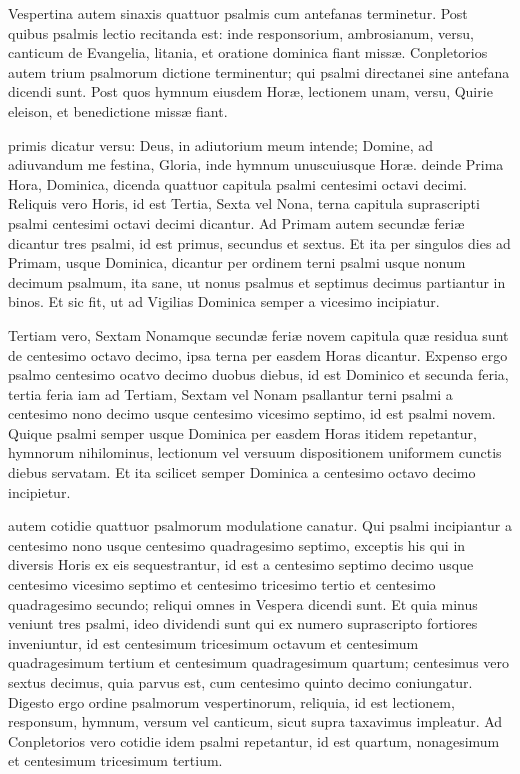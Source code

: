 \documentclass[fontsize=9pt,paper=A6,twoside,BCOR=1mm,DIV=22,headinclude]{scrarticle}
\begin{document}
\begin{multicols}{2}
{Vespertina autem sinaxis quattuor psalmis cum antefanas terminetur. Post quibus psalmis lectio recitanda est: inde responsorium, ambrosianum, versu, canticum de Evangelia, litania, et oratione dominica fiant missæ. Conpletorios autem trium psalmorum dictione terminentur; qui psalmi directanei sine antefana dicendi sunt. Post quos hymnum eiusdem Horæ, lectionem unam, versu, Quirie eleison, et benedictione missæ fiant. 

}

 primis dicatur versu: Deus, in adiutorium meum intende; Domine, ad adiuvandum me festina, Gloria, inde hymnum unuscuiusque Horæ. deinde Prima Hora, Dominica, dicenda quattuor capitula psalmi centesimi octavi decimi. Reliquis vero Horis, id est Tertia, Sexta vel Nona, terna capitula suprascripti psalmi centesimi octavi decimi dicantur. Ad Primam autem secundæ feriæ dicantur tres psalmi, id est primus, secundus et sextus. Et ita per singulos dies ad Primam, usque Dominica, dicantur per ordinem terni psalmi usque nonum decimum psalmum, ita sane, ut nonus psalmus et septimus decimus partiantur in binos. Et sic fit, ut ad Vigilias Dominica semper a vicesimo incipiatur.

 Tertiam vero, Sextam Nonamque secundæ feriæ novem capitula quæ residua sunt de centesimo octavo decimo, ipsa terna per easdem Horas dicantur. Expenso ergo psalmo centesimo ocatvo decimo duobus diebus, id est Dominico et secunda feria, tertia feria iam ad Tertiam, Sextam vel Nonam psallantur terni psalmi a centesimo nono decimo usque centesimo vicesimo septimo, id est psalmi novem. Quique psalmi semper usque Dominica per easdem Horas itidem repetantur, hymnorum nihilominus, lectionum vel versuum dispositionem uniformem cunctis diebus servatam. Et ita scilicet semper Dominica a centesimo octavo decimo incipietur.

 autem cotidie quattuor psalmorum modulatione canatur. Qui psalmi incipiantur a centesimo nono usque centesimo quadragesimo septimo, exceptis his qui in diversis Horis ex eis sequestrantur, id est a centesimo septimo decimo usque centesimo vicesimo septimo et centesimo tricesimo tertio et centesimo quadragesimo secundo; reliqui omnes in Vespera dicendi sunt. Et quia minus veniunt tres psalmi, ideo dividendi sunt qui ex numero suprascripto fortiores inveniuntur, id est centesimum tricesimum octavum et centesimum quadragesimum tertium et centesimum quadragesimum quartum; centesimus vero sextus decimus, quia parvus est, cum centesimo quinto decimo coniungatur. Digesto ergo ordine psalmorum vespertinorum, reliquia, id est lectionem, responsum, hymnum, versum vel canticum, sicut supra taxavimus impleatur. Ad Conpletorios vero cotidie idem psalmi repetantur, id est quartum, nonagesimum et centesimum tricesimum tertium.


\end{multicols}
\end{document}
